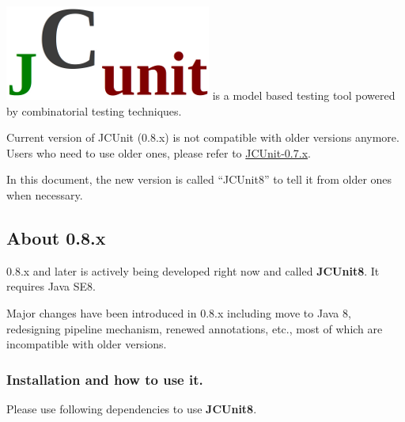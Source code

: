 \includegraphics{src/main/resources/JCunit-logo.png} is a model based
testing tool powered by combinatorial testing techniques.

Current version of JCUnit (0.8.x) is not compatible with older versions
anymore. Users who need to use older ones, please refer to
\href{https://github.com/dakusui/jcunit/wiki/0.7.x}{JCUnit-0.7.x}.

In this document, the new version is called ``JCUnit8'' to tell it from
older ones when necessary.

\subsection{About 0.8.x}\label{about-0.8.x}

0.8.x and later is actively being developed right now and called
\textbf{JCUnit8}. It requires Java SE8.

Major changes have been introduced in 0.8.x including move to Java 8,
redesigning pipeline mechanism, renewed annotations, etc., most of which
are incompatible with older versions.

\subsubsection{Installation and how to use
it.}\label{installation-and-how-to-use-it.}

Please use following dependencies to use \textbf{JCUnit8}.

\begin{Shaded}
\begin{Highlighting}[]

      \NormalTok{[0.8.12,)}
\end{Highlighting}
\end{Shaded}

